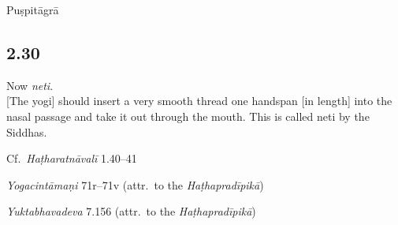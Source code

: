 \begin{ekdosis}
\begin{philcomm}[hp02_029]
\end{philcomm}

\begin{metre}[hp02_029]
Puṣpitāgrā
\end{metre}

\subsection*{2.30}
\begin{translation}[hp02_030]
Now \emph{neti}.\\
{[}The yogi] should insert a very smooth thread one handspan [in length] into the nasal passage and take it out through the mouth. This is called neti by the Siddhas.
\end{translation}


\begin{testimonia}[hp02_030]
Cf.~\emph{Haṭharatnāvalī} 1.40–41

\begin{versinnote}
\end{versinnote}

\emph{Yogacintāmaṇi} 71r–71v (attr.~to the \emph{Haṭhapradīpikā})

\begin{versinnote}
\end{versinnote}

\emph{Yuktabhavadeva} 7.156 (attr.~to the \emph{Haṭhapradīpikā})


\end{testimonia}
\end{ekdosis}
